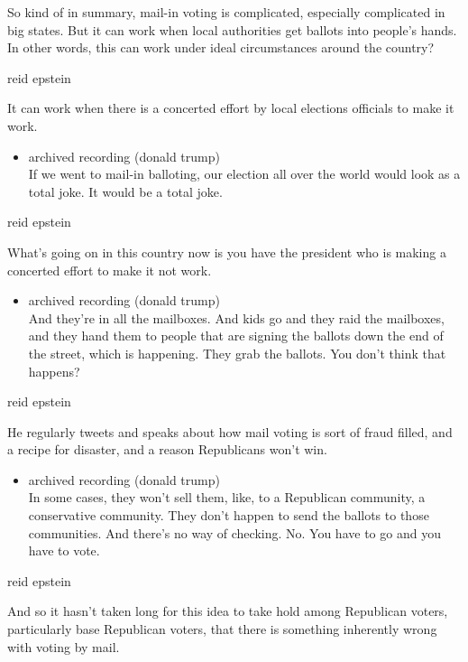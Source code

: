 So kind of in summary, mail-in voting is complicated, especially
complicated in big states. But it can work when local authorities get
ballots into people's hands. In other words, this can work under ideal
circumstances around the country?

reid epstein

It can work when there is a concerted effort by local elections
officials to make it work.

\begin{itemize}
\tightlist
\item
  archived recording (donald trump)\\
  If we went to mail-in balloting, our election all over the world would
  look as a total joke. It would be a total joke.
\end{itemize}

reid epstein

What's going on in this country now is you have the president who is
making a concerted effort to make it not work.

\begin{itemize}
\tightlist
\item
  archived recording (donald trump)\\
  And they're in all the mailboxes. And kids go and they raid the
  mailboxes, and they hand them to people that are signing the ballots
  down the end of the street, which is happening. They grab the ballots.
  You don't think that happens?
\end{itemize}

reid epstein

He regularly tweets and speaks about how mail voting is sort of fraud
filled, and a recipe for disaster, and a reason Republicans won't win.

\begin{itemize}
\tightlist
\item
  archived recording (donald trump)\\
  In some cases, they won't sell them, like, to a Republican community,
  a conservative community. They don't happen to send the ballots to
  those communities. And there's no way of checking. No. You have to go
  and you have to vote.
\end{itemize}

reid epstein

And so it hasn't taken long for this idea to take hold among Republican
voters, particularly base Republican voters, that there is something
inherently wrong with voting by mail.

